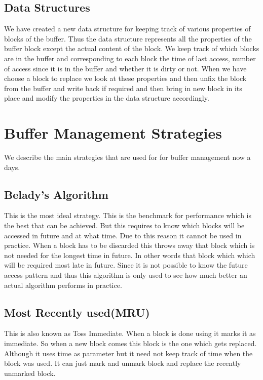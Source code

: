 \subsection*{{Data Structures}}
We have created a new data structure for keeping track of various properties of blocks of the buffer. Thus the data structure represents all the properties of the buffer block except the actual content of the block. We keep track of which blocks are in the buffer and corresponding to each block the time of last access, number of access since it is in the buffer and whether it is dirty or not. When we have choose a block to replace we look at these properties and then unfix the block from the buffer and write back if required and then bring in new block in its place and modify the properties in the data structure accordingly.



\section*{{Buffer Management Strategies}}

We describe the main strategies that are used for for buffer management now a days. 
\subsection*{{Belady's Algorithm}}

This is the most ideal strategy. This is the benchmark for  performance which is the best that can be achieved. But this requires to know which blocks  will be accessed in future and at what time. Due to this reason it cannot be used in practice. When a block has to be discarded this throws away that block which is not needed for the longest time in future. In other words that block which which will be required most late in future. Since it is not possible to know the future access pattern and thus this algorithm is only used to see how much better an actual algorithm performs in practice.
\subsection*{{Most Recently used(MRU)}}

This is also known as Toss Immediate. When a block is done using it marks it as immediate. So when a new block comes this block is the one which gets replaced. Although it uses time as parameter but it need not keep track of time when the block was used. It can just mark and unmark block and replace the recently unmarked block.

